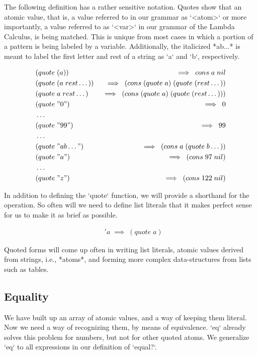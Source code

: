 \documentclass[11pt]{article}
\begin{document}
The following definition has a rather sensitive notation. Quotes show that an atomic value, that is, a value referred to in our grammar as `<atom>` or more importantly, a value referred to as `<var>` in our grammar of the Lambda Calculus, is being matched. This is unique from most cases in which a portion of a pattern is being labeled by a variable. Additionally, the italicized *ab...* is meant to label the first letter and rest of a string as `a` and `b`, respectively.

\begin{align*}
& (quote \; (a)) \; &\implies \; cons \; a \; nil
\\& (quote \; (a \; rest\dots)) \; &\implies \; (cons \; (quote \; a) \; (quote \; (rest\dots))
\\& (quote \; a \; rest\dots) \; &\implies \; (cons \; (quote \; a) \; (quote \; (rest\dots)))
\\& (quote \; "0") \; &\implies \; 0
\\& \dots
\\& (quote \; "99") \; &\implies \; 99
\\& \dots
\\& (quote \; "ab\dots") \; &\implies \; (cons \; a \; (quote \; b\dots))
\\& (quote \; "a") \; &\implies \; (cons \; 97 \; nil)
\\& \dots
\\& (quote \; "z") \; &\implies \; (cons \; 122 \; nil)
\end{align*}

In addition to defining the `quote` function, we will provide a shorthand for the operation. So often will we need to define list literals that it makes perfect sense for us to make it as brief as possible.

\begin{align*}
& 'a \; \implies \; (quote \; a)
\end{align*}

Quoted forms will come up often in writing list literals, atomic values derived from strings, i.e., *atoms*, and forming more complex data-structures from lists such as tables.

\subsection{Equality}
We have built up an array of atomic values, and a way of keeping them literal. Now we need a way of recognizing them, by means of equivalence. `eq` already solves this problem for numbers, but not for other quoted atoms. We generalize `eq` to all expressions in our definition of `equal?`.
\end{document}
